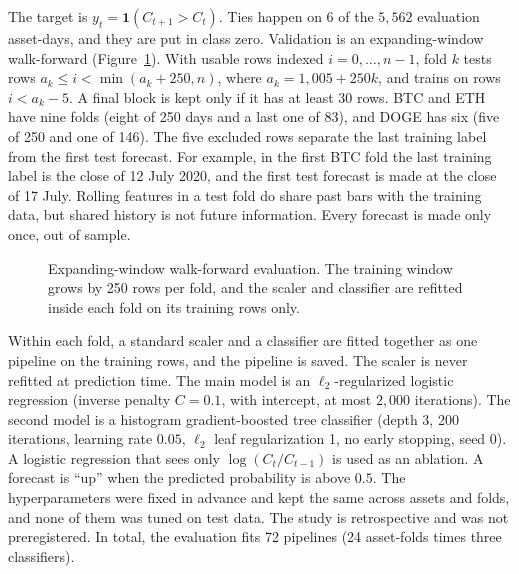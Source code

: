 \documentclass[preprint,12pt,authoryear,a4paper]{elsarticle}
\begin{document}
The target is $y_t=\mathbf{1}(C_{t+1}>C_t)$. Ties happen on 6 of the $5{,}562$
evaluation asset-days, and they are put in class zero. Validation is an
expanding-window walk-forward (Figure~\ref{fig:wf}). With usable rows indexed
$i=0,\dots,n-1$, fold $k$ tests rows $a_k\le i<\min(a_k+250,n)$, where
$a_k=1{,}005+250k$, and trains on rows $i<a_k-5$. A final block is kept only if it
has at least 30 rows. BTC and ETH have nine folds (eight of 250 days and a last one
of 83), and DOGE has six (five of 250 and one of 146). The five excluded rows
separate the last training label from the first test forecast. For example, in the
first BTC fold the last training label is the close of 12 July 2020, and the first
test forecast is made at the close of 17 July. Rolling features in a test fold do
share past bars with the training data, but shared history is not future
information. Every forecast is made only once, out of sample.

\begin{figure}[htbp]\centering
{}
\caption{Expanding-window walk-forward evaluation. The training window grows by 250
rows per fold, and the scaler and classifier are refitted inside each fold on its
training rows only.}
\label{fig:wf}
\end{figure}

Within each fold, a standard scaler and a classifier are fitted together as one
pipeline on the training rows, and the pipeline is saved. The scaler is never
refitted at prediction time. The main model is an $\ell_2$-regularized logistic
regression (inverse penalty $C=0.1$, with intercept, at most $2{,}000$ iterations).
The second model is a histogram gradient-boosted tree classifier (depth 3, 200
iterations, learning rate $0.05$, $\ell_2$ leaf regularization 1, no early stopping,
seed 0). A logistic regression that sees only $\log(C_t/C_{t-1})$ is used as an
ablation. A forecast is ``up'' when the predicted probability is above $0.5$. The
hyperparameters were fixed in advance and kept the same across assets and folds,
and none of them was tuned on test data. The study is retrospective and was not
preregistered. In total, the evaluation fits 72 pipelines (24 asset-folds times
three classifiers).
\end{document}
